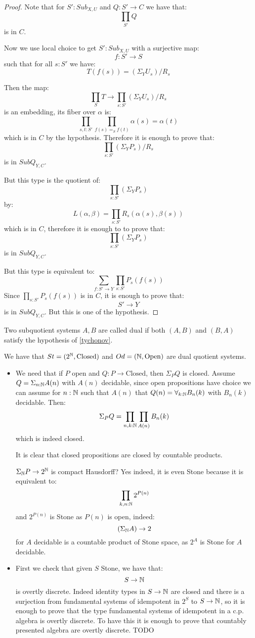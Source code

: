 \begin{proof}
Note that for $S':Sub_{X,U}$ and $Q:S'\to C$ we have that:
\[\prod_{S'}Q\]
is in $C$.

Now we use local choice to get $S':Sub_{X,U}$ with a surjective map:
\[f:S'\to S\]
such that for all $s:S'$ we have:
\[T(f(s)) = (\Sigma_YU_s)/R_s\]

Then the map:
\[\prod_ST \to \prod_{s:S'}(\Sigma_YU_s)/R_s\]
is an embedding, its fiber over $\alpha$ is:
\[\prod_{s,t:S'} \prod_{f(s) =_S f(t)} \alpha(s) = \alpha(t)\]
which is in $C$ by the hypothesis. Therefore it is enough to prove that:
\[\prod_{s:S'}(\Sigma_YP_s)/R_s\]
is in $SubQ_{Y,C}$. 

But this type is the quotient of:
\[\prod_{s:S'}(\Sigma_YP_s)\]
by:
\[L(\alpha,\beta) = \prod_{s:S'} R_s(\alpha(s),\beta(s))\]
which is in $C$, therefore it is enough to to prove that:
\[\prod_{s:S'}(\Sigma_YP_s)\]
is in $SubQ_{Y,C}$.

But this type is equivalent to:
\[\sum_{f:S'\to Y} \prod_{s:S'}P_s(f(s))\]
Since $\prod_{s:S'}P_s(f(s))$ is in $C$, it is enough to prove that:
\[S'\to Y\]
is in $SubQ_{Y,C}$. But this is one of the hypothesis.
\end{proof}

\begin{definition}
Two subquotient systems $A,B$ are called dual if both $(A,B)$ and $(B,A)$ satisfy the hypothesis of \cref{tychonov}.
\end{definition}

\begin{example}
We have that $St = (2^{\mathbb{N}},\mathrm{Closed})$ and $Od = (\mathbb{N},\mathrm{Open})$ are dual quotient systems.

\begin{itemize}
\item We need that if $P$ open and $Q:P\to \mathrm{Closed}$, then $\Sigma_PQ$ is closed. Assume $Q=\Sigma_{n:\mathbb{N}}A(n)$ with $A(n)$ decidable, since open propositions have choice we can assume for $n:\mathbb{N}$ such that $A(n)$ that $Q(n) = \forall_{k:\mathbb{N}} B_n(k)$ with $B_n(k)$ decidable. Then:
\[\Sigma_PQ = \prod_{n,k:\mathbb{N}} \prod_{A(n)} B_n(k) \]
which is indeed closed.

It is clear that closed propositions are closed by countable products.

$\Sigma_{\mathbb{N}} P\to 2^{\mathbb{N}}$ is compact Hausdorff? Yes indeed, it is even Stone because it is equivalent to:
\[\prod_{k,n:\mathbb{N}} 2^{P(n)}\]
and $2^{P(n)}$ is Stone as $P(n)$ is open, indeed:
\[(\Sigma_{\mathbb{N}} A)\to 2\] 
for $A$ decidable is a countable product of Stone space, as $2^A$ is Stone for $A$ decidable.

\item First we check that given $S$ Stone, we have that:
\[S\to \mathbb{N}\]
is overtly discrete. Indeed identity types in $S\to \mathbb{N}$ are closed and there is a surjection from fundamental systems of idempotent in $2^S$ to $S\to \mathbb{N}$, so it is enough to prove that the type fundamental systems of idempotent in a c.p. algebra is overtly discrete. To have this it is enough to prove that countably presented algebra are overtly discrete. TODO
\end{itemize}
\end{example}

